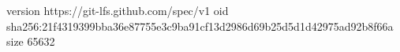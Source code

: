 version https://git-lfs.github.com/spec/v1
oid sha256:21f4319399bba36e87755e3c9ba91cf13d2986d69b25d5d1d42975ad92b8f66a
size 65632
